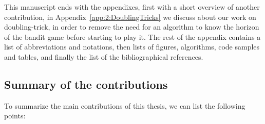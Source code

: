 This manuscript ends with the appendixes, first with a short overview of another contribution, in Appendix~\ref{app:2:DoublingTricks} we discuss about our work on doubling-trick, in order to remove the need for an algorithm to know the horizon of the bandit game before starting to play it.
The rest of the appendix contains a list of abbreviations and notations, then lists of figures, algorithms, code samples and tables,
and finally the list of the bibliographical references.




\newpage %

\subsection{Summary of the contributions}
\label{sec:1:summaryOfContributions}

To summarize the main contributions of this thesis, we can list the following points:

